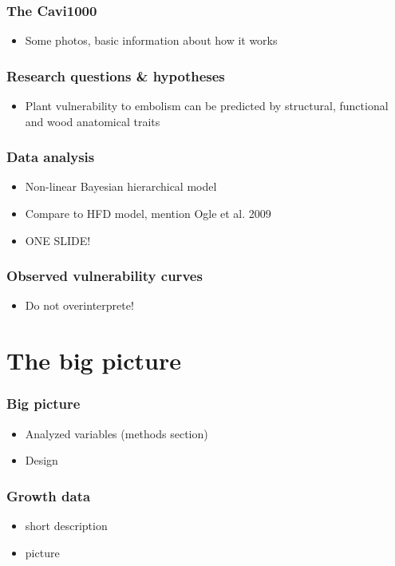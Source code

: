 \documentclass[usepdftitle=false]{beamer}
\begin{document}
\begin{frame}
	\frametitle{The Cavi1000}
	\begin{itemize}
		\item Some photos, basic information about how it works
	\end{itemize}
\end{frame}

\begin{frame}
	\frametitle{Research questions \& hypotheses}
	\begin{itemize}
		\item Plant vulnerability to embolism can be predicted by structural, functional and wood anatomical traits
	\end{itemize}
\end{frame}

\begin{frame}
	\frametitle{Data analysis}
	\begin{itemize}
		\item Non-linear Bayesian hierarchical model
		\item Compare to HFD model, mention Ogle et al. 2009
		\item ONE SLIDE!
	\end{itemize}
\end{frame}

\begin{frame}
	\frametitle{Observed vulnerability curves}
	\begin{itemize}
		\item Do not overinterprete!
	\end{itemize}
\end{frame}

\section{The big picture}
\begin{frame}
	\frametitle{Big picture}
	\begin{itemize}
		\item Analyzed variables (methods section)
		\item Design		
	\end{itemize}
\end{frame}

\begin{frame}
	\frametitle{Growth data}
	\begin{itemize}
		\item short description
		\item picture
	\end{itemize}
\end{frame}
\end{document}
